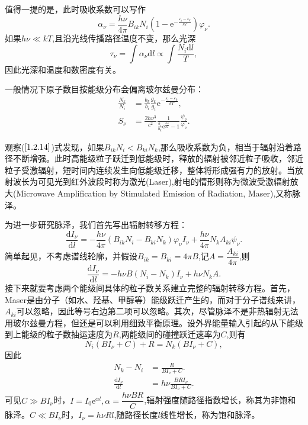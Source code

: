 \documentclass[../天体物理基础.tex]{subfiles}
\begin{document}
值得一提的是，此时吸收系数可以写作
\begin{equation}
\alpha_{\nu}=\frac{h\nu}{4\pi}B_{ik}N_{i}\left(1-\mathrm{e}^{-\frac{\varepsilon_{i}-\varepsilon_{k}}{kT}}\right)\varphi_{\nu}.
\end{equation}
如果$h\nu\ll kT$,且沿光线传播路径温度不变，那么光深
\begin{equation}
\tau_{\nu}=\int\alpha_{\nu}\mathrm{d}l\propto{}\int\frac{N_{i}\mathrm{d}l}{T},
\end{equation}
因此光深和温度和数密度有关。

一般情况下原子数目按能级分布会偏离玻尔兹曼分布：
\begin{align}
\frac{N_k}{N_i}&=\frac{b_k}{b_i}\frac{g_k}{g_i}\mathrm{e}^{-\frac{\varepsilon_i-\varepsilon_k}{kT}},\\
S_\nu&=\frac{2h\nu^3}{c^2}\frac{1}{\frac{b_i}{b_k}\mathrm{e}^{\frac{h\nu}{kT}}-1}\frac{\psi_\nu}{\varphi_\nu}.
\end{align}

观察($\ref{1.2.14}$)式发现，如果$B_{ik}N_{i}<B_{ki}N_{k}$,那么吸收系数为负，相当于辐射沿着路径不断增强。此时高能级粒子跃迁到低能级时，释放的辐射被邻近粒子吸收，邻近粒子受激辐射，短时间内连续发生向低能级迁移，整体将形成强有力的放射。当放射波长为可见光到红外波段时称为激光(Laser),射电的情形则称为微波受激辐射放大(Microwave Amplification by Stimulated Emission of Radiation, Maser),又称脉泽。

为进一步研究脉泽，我们首先写出辐射转移方程：
\begin{equation}
\frac{\mathrm{d}I_{\nu}}{\mathrm{d}l}=-\frac{h\nu}{4\pi}\left(B_{ik}N_{i}-B_{ki}N_{k}\right)\varphi_{\nu}I_{\nu}+\frac{h\nu}{4\pi}N_{k}A_{ki}\psi_{\nu}.
\end{equation}
简单起见，不考虑谱线轮廓，并假设$B_{ik}=B_{ki}=4\pi B$,记$A=\dfrac{A_{ki}}{4\pi}$,则
\begin{equation}
\frac{\mathrm{d}I_{\nu}}{\mathrm{d}l}=-h\nu B\left(N_{i}-N_{k}\right)I_{\nu}+h\nu N_{k}A.
\end{equation}
接下来就要考虑两个能级间具体的粒子数关系建立完整的辐射转移方程。首先，Maser是由分子（如水、羟基、甲醇等）能级跃迁产生的，而对于分子谱线来讲，$A_{ki}$可以忽略，因此等号右边第二项可以忽略。其次，尽管脉泽不是非热辐射无法用玻尔兹曼方程，但还是可以利用细致平衡原理。设外界能量输入引起的从下能级到上能级的粒子数抽运速度为$R$,两能级间的碰撞跃迁速率为$C$,则有
\begin{equation}
N_{i}\left(BI_{\nu}+C\right)+R=N_{k}\left(BI_{\nu}+C\right),
\end{equation}
因此
\begin{align}
N_{k}-N_{i}&=\frac{R}{BI_{\nu}+C}.\\
\frac{\mathrm{d}I_{\nu}}{\mathrm{d}l}&=h\nu \frac{BRI_{\nu}}{BI_{\nu}+C}.
\end{align}
可见$C\gg BI_{\nu}$时，$I=I_{0}\mathrm{e}^{\alpha l},\alpha=\dfrac{h\nu BR}{C}$,辐射强度随路径指数增长，称其为非饱和脉泽。$C\ll BI_{\nu}$时，$I_{\nu}=h\nu Rl$,随路径长度$l$线性增长，称为饱和脉泽。
\end{document}
